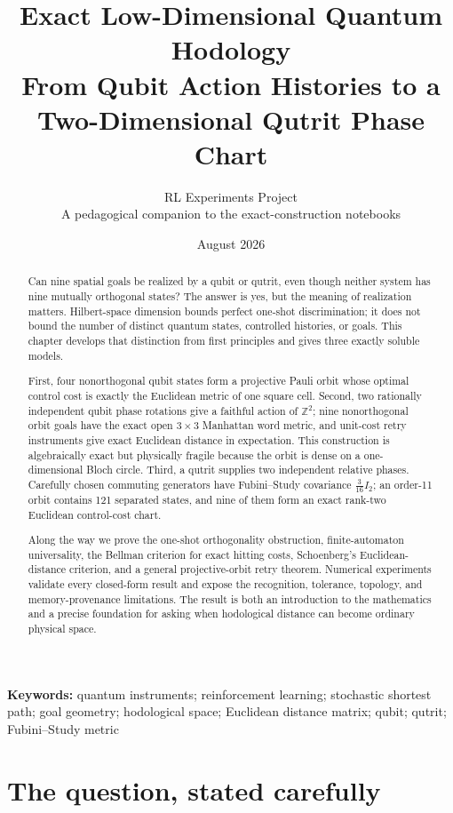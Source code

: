 \documentclass[11pt]{article}
\title{\textbf{Exact Low-Dimensional Quantum Hodology}\\
\large From Qubit Action Histories to a Two-Dimensional Qutrit Phase Chart}
\author{RL Experiments Project\\
\small A pedagogical companion to the exact-construction notebooks}
\date{August 2026}
\theoremstyle{definition}
\theoremstyle{remark}
\newcommand{\Z}{\mathbb Z}
\begin{document}
\maketitle

\begin{abstract}
Can nine spatial goals be realized by a qubit or qutrit, even though neither
system has nine mutually orthogonal states? The answer is yes, but the meaning
of realization matters. Hilbert-space dimension bounds perfect one-shot
discrimination; it does not bound the number of distinct quantum states,
controlled histories, or goals. This chapter develops that distinction from
first principles and gives three exactly soluble models.

First, four nonorthogonal qubit states form a projective Pauli orbit whose
optimal control cost is exactly the Euclidean metric of one square cell.
Second, two rationally independent qubit phase rotations give a faithful
action of $\Z^2$; nine nonorthogonal orbit goals have the exact open
$3\times3$ Manhattan word metric, and unit-cost retry instruments give exact
Euclidean distance in expectation. This construction is algebraically exact
but physically fragile because the orbit is dense on a one-dimensional Bloch
circle. Third, a qutrit supplies two independent relative phases. Carefully
chosen commuting generators have Fubini--Study covariance
$\frac{3}{16}I_2$; an order-11 orbit contains 121 separated states, and nine
of them form an exact rank-two Euclidean control-cost chart.

Along the way we prove the one-shot orthogonality obstruction, finite-automaton
universality, the Bellman criterion for exact hitting costs, Schoenberg's
Euclidean-distance criterion, and a general projective-orbit retry theorem.
Numerical experiments validate every closed-form result and expose the
recognition, tolerance, topology, and memory-provenance limitations. The
result is both an introduction to the mathematics and a precise foundation
for asking when hodological distance can become ordinary physical space.
\end{abstract}

\noindent\textbf{Keywords:} quantum instruments; reinforcement learning;
stochastic shortest path; goal geometry; hodological space; Euclidean distance
matrix; qubit; qutrit; Fubini--Study metric

\tableofcontents
\newpage

\section{The question, stated carefully}
\label{sec:motivation}
\end{document}
